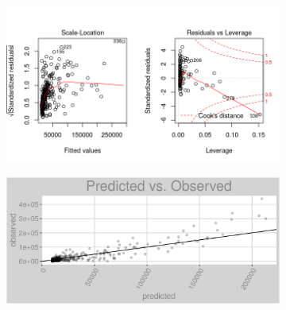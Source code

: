 \begin{figure}[h]
\centering
\begin{subfigure}{1\textwidth}
\centering
\includegraphics[width=.99\textwidth, height=0.475\textheight]{Images/district_heat_rfe_res_2.png}
\end{subfigure}
\begin{subfigure}{1\textwidth}
\centering
\includegraphics[width=.99\textwidth, height=0.3\textheight]{Images/district_heat_rfe_pvo.png}
\end{subfigure}
\end{figure}
\FloatBarrier
\newpage
